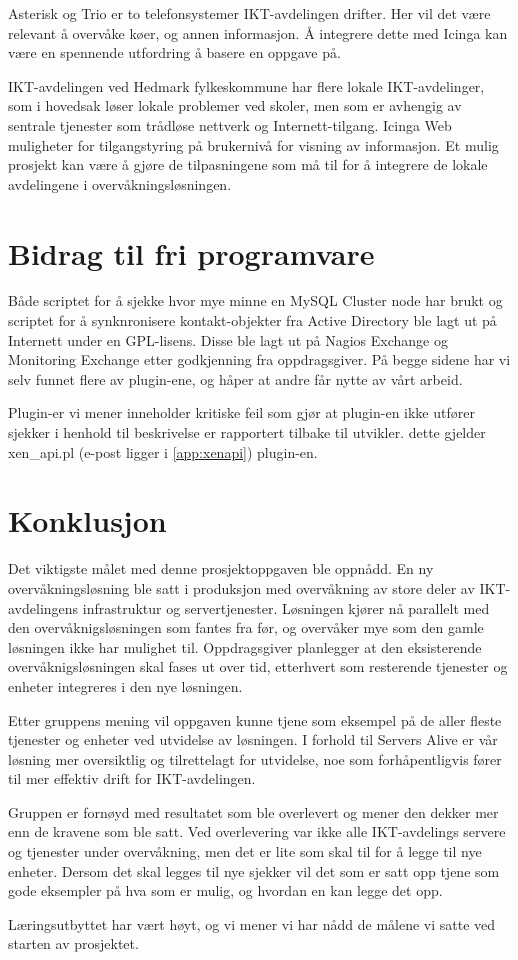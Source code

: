 Asterisk og Trio er to telefonsystemer IKT-avdelingen drifter. Her vil det være relevant å overvåke køer, og annen informasjon. Å integrere dette med Icinga kan være en spennende utfordring å basere en oppgave på.

IKT-avdelingen ved Hedmark fylkeskommune har flere lokale IKT-avdelinger, som i hovedsak løser lokale problemer ved skoler, men som er avhengig av sentrale tjenester som trådløse nettverk og Internett-tilgang. Icinga Web muligheter for tilgangstyring på brukernivå for visning av informasjon. Et mulig prosjekt kan være å gjøre de tilpasningene som må til for å integrere de lokale avdelingene i overvåkningsløsningen. 

\section{Bidrag til fri programvare}
Både scriptet for å sjekke hvor mye minne en MySQL Cluster node har brukt og scriptet for å synknronisere kontakt-objekter fra Active Directory ble lagt ut på Internett under en GPL-lisens. Disse ble lagt ut på Nagios Exchange\cite{monkeymonndb,monkeymonadsync} og Monitoring Exchange\cite{monkeyexchange} etter godkjenning fra oppdragsgiver. På begge sidene har vi selv funnet flere av plugin-ene, og håper at andre får nytte av vårt arbeid.

Plugin-er vi mener inneholder kritiske feil som gjør at plugin-en ikke utfører sjekker i henhold til beskrivelse er rapportert tilbake til utvikler. dette gjelder xen\_api.pl (e-post ligger i \ref{app:xenapi}) plugin-en.
 
\section{Konklusjon}
Det viktigste målet med denne prosjektoppgaven ble oppnådd. En ny overvåkningsløsning ble satt i produksjon med overvåkning av store deler av IKT-avdelingens infrastruktur og servertjenester. Løsningen kjører nå parallelt med den overvåknigsløsningen som fantes fra før, og overvåker mye som den gamle løsningen ikke har mulighet til. Oppdragsgiver planlegger at den eksisterende overvåknigsløsningen skal fases ut over tid, etterhvert som resterende tjenester og enheter integreres i den nye løsningen. 

Etter gruppens mening vil oppgaven kunne tjene som eksempel på de aller fleste tjenester og enheter ved utvidelse av løsningen. I forhold til Servers Alive er vår løsning mer oversiktlig og tilrettelagt for utvidelse, noe som forhåpentligvis fører til mer effektiv drift for IKT-avdelingen.

Gruppen er fornøyd med resultatet som ble overlevert og mener den dekker mer enn de kravene som ble satt. Ved overlevering var ikke alle IKT-avdelings servere og tjenester under overvåkning, men det er lite som skal til for å legge til nye enheter. Dersom det skal legges til nye sjekker vil det som er satt opp tjene som gode eksempler på hva som er mulig, og hvordan en kan legge det opp.

Læringsutbyttet har vært høyt, og vi mener vi har nådd de målene vi satte ved starten av prosjektet. 
